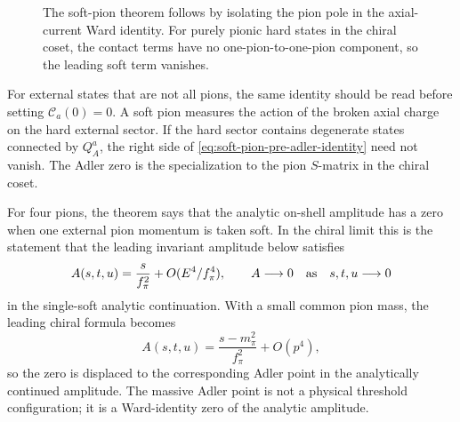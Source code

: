\begin{figure}[H]
  \centering
  \caption{The soft-pion theorem follows by isolating the pion pole in the
  axial-current Ward identity.  For purely pionic hard states in the chiral
  coset, the contact terms have no one-pion-to-one-pion component, so the
  leading soft term vanishes.}
  \label{fig:soft-pion-ward-adler-zero}
\end{figure}

For external states that are not all pions, the same identity should be read
before setting \(\mathcal C_a(0)=0\).  A soft pion measures the action of the
broken axial charge on the hard external sector.  If the hard sector contains
degenerate states connected by \(Q_A^a\), the right side of
\eqref{eq:soft-pion-pre-adler-identity} need not vanish.  The Adler zero is the
specialization to the pion \(S\)-matrix in the chiral coset.

For four pions, the theorem says that the analytic on-shell amplitude has a
zero when one external pion momentum is taken soft.  In the chiral limit this
is the statement that the leading invariant amplitude below satisfies
\[
  A(s,t,u)=\frac{s}{f_\pi^2}+O(E^4/f_\pi^4),
  \qquad
  A\longrightarrow0
  \quad\hbox{as}\quad s,t,u\longrightarrow0
\]
in the single-soft analytic continuation.  With a small common pion mass, the
leading chiral formula becomes
\[
  A(s,t,u)=\frac{s-m_\pi^2}{f_\pi^2}+O(p^4),
\]
so the zero is displaced to the corresponding Adler point in the analytically
continued amplitude.  The massive Adler point is not a physical threshold
configuration; it is a Ward-identity zero of the analytic amplitude.

